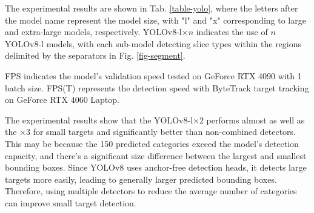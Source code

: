 \documentclass[runningheads]{llncs}
\begin{document}
The experimental results are shown in Tab. \ref{table-yolo}, where the letters after the model name represent the model size,
with "l" and "x" corresponding to large and extra-large models, respectively.
YOLOv8-l$\times n$ indicates the use of $n$ YOLOv8-l models,
with each sub-model detecting slice types within the regions delimited by the separators in Fig. \ref{fig-segment}.

FPS indicates the model's validation speed tested on GeForce RTX 4090 with 1 batch size.
FPS(T) represents the detection speed with ByteTrack target tracking \cite{ByteTrack} on GeForce RTX 4060 Laptop.


The experimental results show that the YOLOv8-l$\times 2$ performs almost as well as the $\times 3$ for small targets and significantly better than non-combined detectors.
This may be because the 150 predicted categories exceed the model's detection capacity,
and there's a significant size difference between the largest and smallest bounding boxes.
Since YOLOv8 uses anchor-free detection heads, it detects large targets more easily,
leading to generally larger predicted bounding boxes.
Therefore, using multiple detectors to reduce the average number of categories can improve small target detection.
\end{document}
